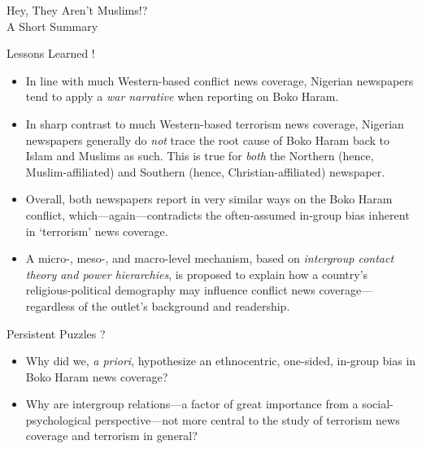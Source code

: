 
\vspace*{1mm}
\begin{flushright}
\Large{Hey, They Aren't Muslims!? \\
A Short Summary}
\end{flushright} 

\vspace{1cm}
\normalsize

\begin{Box1}{Lessons Learned !}
\begin{itemize}[noitemsep]
\item In line with much Western-based conflict news coverage, Nigerian newspapers tend to apply a \textit{war narrative} when reporting on Boko Haram.
\item In sharp contrast to much Western-based terrorism news coverage, Nigerian newspapers generally do \textit{not} trace the root cause of Boko Haram back to Islam and Muslims as such. This is true for \textit{both} the Northern (hence, Muslim-affiliated) and Southern (hence, Christian-affiliated) newspaper. 
\item Overall, both newspapers report in very similar ways on the Boko Haram conflict, which---again---contradicts the often-assumed in-group bias inherent in `terrorism' news coverage.
\item A micro-, meso-, and macro-level mechanism, based on \textit{intergroup contact theory and power hierarchies}, is proposed to explain how a country's religious-political demography may influence conflict news coverage---regardless of the outlet's background and readership.
\end{itemize}
\end{Box1}

\vspace{1cm}

\begin{Box1}{Persistent Puzzles ?}
\begin{itemize}[noitemsep]
\item Why did we, \textit{a priori}, hypothesize an ethnocentric, one-sided, in-group bias in Boko Haram news coverage? 
\item Why are intergroup relations---a factor of great importance from a social-psychological perspective---not more central to the study of terrorism news coverage and terrorism in general?
\end{itemize}
\end{Box1}
